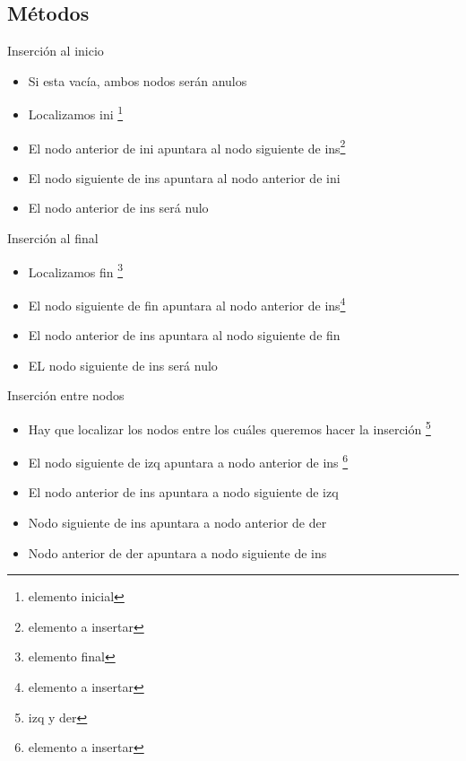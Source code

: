 \documentclass{beamer}
\begin{document}
\subsection{M\'etodos}

\begin{frame}{Inserci\'on al inicio}
	\begin{itemize}
		\item Si esta vac\'ia, ambos nodos serán anulos
		\item Localizamos ini \footnote{elemento inicial}
		\item El nodo anterior de ini apuntara al nodo siguiente de ins\footnote{elemento a insertar}
		\item El nodo siguiente de ins apuntara al nodo anterior de ini
		\item El nodo anterior de ins ser\'a nulo
	\end{itemize}
	\centering
\end{frame}

\begin{frame}{Inserci\'on al final}
	\begin{itemize}
		\item Localizamos fin \footnote{elemento final}
		\item El nodo siguiente de fin apuntara al nodo anterior de ins\footnote{elemento a insertar}
		\item El nodo anterior de ins apuntara al nodo siguiente de fin
		\item EL nodo siguiente de ins ser\'a nulo
	\end{itemize}
\end{frame}

\begin{frame}{Inserci\'on entre nodos}
	\begin{itemize}
		\item Hay que localizar los nodos entre los cu\'ales queremos hacer la inserci\'on \footnote{izq y der}
		\item El nodo siguiente de izq apuntara a nodo anterior de ins \footnote{elemento a insertar}
		\item El nodo anterior de ins apuntara a nodo siguiente de izq
		\item Nodo siguiente de ins apuntara a nodo anterior de der
		\item Nodo anterior de der apuntara a nodo siguiente de ins
	\end{itemize}
\end{frame}
\end{document}
